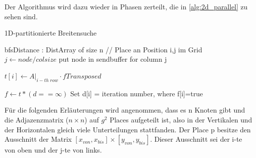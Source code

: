  Der Algorithmus wird dazu wieder in Phasen zerteilt, die in \ref{alg:2d_parallel} zu sehen sind.

 \begin{algorithm}[h]
	\caption{1D-partitionierte Breitensuche}
	\label{alg:2d_parallel}
	\begin{algorithmic}[1]
		\State bfsDistance : DistArray of size n 
			\State // Place an Position i,j im Grid
					\State $j \gets \mathit{node} / \mathit{colsize} $
					\State put node in sendbuffer for column j
				\EndFor

					\State $t[i] \gets A\big|_{i-th\;row} \cdot \mathit{fTransposed}$
				\EndFor

				\EndFor

				\State $f \gets t * (d==\infty)$
				\State Set d[i] = iteration number, where f[i]=true
			\EndWhile
		\EndFor
	\end{algorithmic}
\end{algorithm}
Für die folgenden Erläuterungen wird angenommen, dass es n Knoten gibt und die Adjazenzmatrix ($n \times n$) auf $g^2$ Places aufgeteilt ist, also in der Vertikalen und der Horizontalen gleich viele Unterteilungen stattfanden. Der Place p besitze den Ausschnitt der Matrix $\left[x_{von}, x_{bis} \right] \times \left[y_{von}, y_{bis} \right]$. Dieser Ausschnitt sei der i-te von oben und der j-te von links. 


